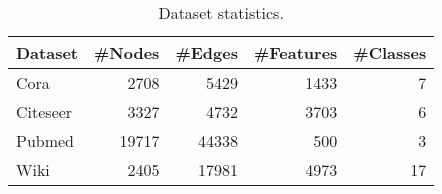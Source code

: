 \documentclass{article}
\begin{document}
\begin{table}[t]
\centering
\footnotesize

\begin{tabular}{lrrrr}
    \toprule
    Dataset    & \#Nodes & \#Edges & \#Features  & \#Classes  \\
    \midrule
    Cora       & 2708   & 5429   & 1433    & 7   \\
    Citeseer   & 3327   & 4732   & 3703    & 6  \\
    Pubmed     & 19717  & 44338  & 500     & 3     \\
    Wiki       & 2405   & 17981  & 4973    & 17  \\
    \bottomrule
\end{tabular}
\caption{Dataset statistics.}
\label{tab:dataset}
\end{table}
\end{document}
